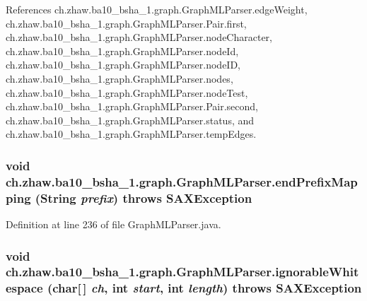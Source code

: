 References ch.zhaw.ba10\_\-bsha\_\-1.graph.GraphMLParser.edgeWeight, ch.zhaw.ba10\_\-bsha\_\-1.graph.GraphMLParser.Pair.first, ch.zhaw.ba10\_\-bsha\_\-1.graph.GraphMLParser.nodeCharacter, ch.zhaw.ba10\_\-bsha\_\-1.graph.GraphMLParser.nodeId, ch.zhaw.ba10\_\-bsha\_\-1.graph.GraphMLParser.nodeID, ch.zhaw.ba10\_\-bsha\_\-1.graph.GraphMLParser.nodes, ch.zhaw.ba10\_\-bsha\_\-1.graph.GraphMLParser.nodeTest, ch.zhaw.ba10\_\-bsha\_\-1.graph.GraphMLParser.Pair.second, ch.zhaw.ba10\_\-bsha\_\-1.graph.GraphMLParser.status, and ch.zhaw.ba10\_\-bsha\_\-1.graph.GraphMLParser.tempEdges.\hypertarget{classch_1_1zhaw_1_1ba10__bsha__1_1_1graph_1_1GraphMLParser_a79c9275778e96cb44d16b466a2a58075}{
\subsubsection[{endPrefixMapping}]{\setlength{\rightskip}{0pt plus 5cm}void ch.zhaw.ba10\_\-bsha\_\-1.graph.GraphMLParser.endPrefixMapping (String {\em prefix})  throws SAXException }}
\label{classch_1_1zhaw_1_1ba10__bsha__1_1_1graph_1_1GraphMLParser_a79c9275778e96cb44d16b466a2a58075}


Definition at line 236 of file GraphMLParser.java.\hypertarget{classch_1_1zhaw_1_1ba10__bsha__1_1_1graph_1_1GraphMLParser_ac4e0c2da8416b919f9841b646f3d058d}{
\subsubsection[{ignorableWhitespace}]{\setlength{\rightskip}{0pt plus 5cm}void ch.zhaw.ba10\_\-bsha\_\-1.graph.GraphMLParser.ignorableWhitespace (char\mbox{[}$\,$\mbox{]} {\em ch}, \/  int {\em start}, \/  int {\em length})  throws SAXException }}
\label{classch_1_1zhaw_1_1ba10__bsha__1_1_1graph_1_1GraphMLParser_ac4e0c2da8416b919f9841b646f3d058d}


